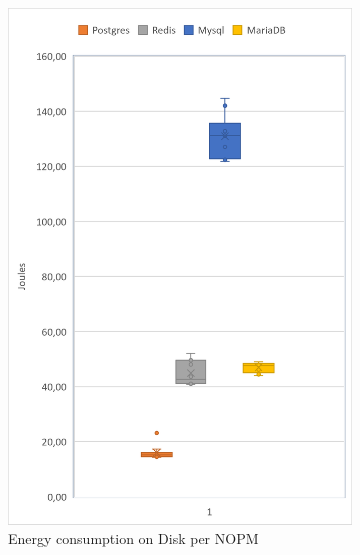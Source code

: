 \begin{figure}[!ht]
\begin{subfigure}[b]{0.32\textwidth}
            \includegraphics[width=1\columnwidth]{results/boxplot/10m/Disk-nopm.png}
            \caption[]%
            {{\small Energy consumption on Disk per NOPM}}    
            \label{fig:bocplotnopmdisk10m}
        \end{subfigure}
        \begin{subfigure}[b]{0.32\textwidth}  
            \centering 

\end{subfigure}
\end{figure}
